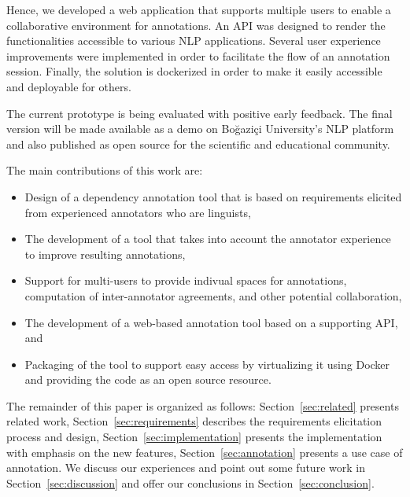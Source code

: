 
Hence, we developed a web application that supports multiple users to enable a collaborative environment for annotations.
An API was designed to render the functionalities accessible to various NLP applications.
Several user experience improvements were implemented in order to facilitate the flow of an annotation session.
Finally, the solution is dockerized in order to make it easily accessible and deployable for others.

The current prototype is being evaluated with positive early feedback.
The final version will be made available as a demo on Boğaziçi University's NLP platform~\cite{DIP} and also published as open source for the scientific and educational community.

The main contributions of this work are:
\begin{itemize}
        \item Design of a dependency annotation tool that is based on requirements elicited from experienced annotators who are linguists,
        \item The development of a tool that takes into account the annotator experience to improve resulting annotations,
        \item Support for multi-users to provide indivual spaces for annotations, computation of inter-annotator agreements, and other potential collaboration,
        \item The development of a web-based annotation tool based on a supporting API, and
        \item Packaging of the tool to support easy access by virtualizing it using Docker and providing the code as an open source resource.
\end{itemize}
The remainder of this paper is organized as follows:
Section~\ref{sec:related} presents related work,
Section~\ref{sec:requirements} describes the requirements elicitation process and design,
Section~\ref{sec:implementation} presents the implementation with emphasis on the new features,
Section~\ref{sec:annotation} presents a use case of annotation.
We discuss our experiences and point out some future work in Section~\ref{sec:discussion} and offer our conclusions  in Section~\ref{sec:conclusion}.
